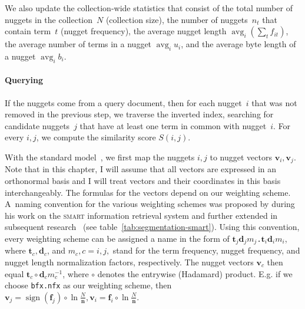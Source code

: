 \documentclass[
  digital, %
  notable, %
  lof,     %
  lot,     %
  nopalatino, color
]{fithesis3}
\newcommand{\op}[1]{\ensuremath{\operatorname{#1}}}
\newcommand{\avg}{\op{avg}}
\newcommand{\sign}{\op{sign}}
\def\abbr#1{\textsc{\MakeLowercase{#1}}}
\let\subsubsection=\paragraph
\begin{document}
We also update the collection-wide statistics that consist of the total number
of nuggets in the collection~$N$ (collection size), the number of nuggets~$n_t$
that contain term~$t$ (nugget frequency), the average nugget length
$\avg_i(\sum_t f_{it})$, the average number of terms in a nugget $\avg_i u_i$,
and the average byte length of a nugget $\avg_i b_i$.

\subsubsection{Querying}
If the nuggets come from a query document, then for each nugget~$i$ that was
not removed in the previous step, we traverse the inverted index, searching
for candidate nuggets~$j$ that have at least one term in common with nugget~$i$.
For every $i,j$, we compute the similarity score $S(i, j)$.

With the standard model~\cite{ir:Salton1975}, we first
map the nuggets $i,j$ to
nugget vectors $\mathbf{v}_i,\mathbf{v}_j$. Note that in this chapter, I will
assume that all vectors are expressed in an orthonormal basis and I will treat
vectors and their coordinates in this basis interchangeably. The formulas for the vectors
depend on our weighting scheme. A~naming convention for the various weighting
schemes was proposed by \textcite{ml:salton71smart} during his work on the \abbr{SMART}
information retrieval system and further extended in
subsequent research~\cite{ml:SaltonBuckley1988,singhaletal95} (see
table~\ref{tab:segmentation-smart}).  Using this convention, every weighting scheme can be
assigned a name in the form of
$\mathbf{t}_j\mathbf{d}_jm_j$\texttt{.}$\mathbf{t}_i\mathbf{d}_im_i$, where
$\mathbf{t}_c, \mathbf{d}_c$, and $m_c, c=i,j,$ stand for the term frequency,
nugget frequency, and nugget length normalization factors, respectively.
The nugget vectors $\mathbf{v}_c$ then equal
$\mathbf{t}_c\circ\mathbf{d}_cm_c^{-1}$, where $\circ$ denotes the entrywise
(Hadamard) product. E.g. if we choose \texttt{bfx.nfx} as our weighting scheme,
then $\mathbf{v}_j=\sign(\mathbf{f}_j)\circ\ln\frac{N}{\mathbf
n},\mathbf{v}_i=\mathbf{f}_i\circ\ln\frac{N}{\mathbf n}$.
\end{document}
